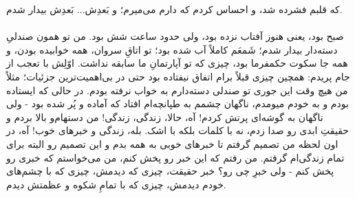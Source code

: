 \documentclass[12pt]{book}
\begin{document}
که قلبم فشرده شد، و احساس کردم که دارم می‌میرم؛ و بَعدِش... بَعدِش بیدار شدم.

    \paragraph{}
    صبح بود، یعنی هنوز آفتاب نزده بود، ولی حدود ساعت شش بود. من تو همون صندلیِ دسته‌دار بیدار شدم؛ شَمعَم کاملاً آب شده بود؛ تو اتاقِ سروان، همه خوابیده بودن، و همه جا سکوت حکمفرما بود، چیزی که تو آپارتمانِ ما سابقه نداشت. اوّلِش با تعجب از جام پریدم: همچین چیزی قبلاً برام اتفاق نیفتاده بود حتی در بی‌اهمیت‌ترین جزئیات؛ مثلاً من هیچ وقت این جوری تو صندلی دسته‌دارم به خواب نرفته بودم. در حالی که ایستاده بودم و به خودم میومدم، ناگهان چشمم به طپانچه‌ام افتاد که آماده و پُر شده بود - ولی ناگهان به گوشه‌ای پرتش کردم! آه، حالا، زندگی، زندگی! من دستهام‌و بالا بردم و حقیقتِ ابدی رو صدا زدم، نه با کلمات بلکه با اشک. بله، زندگی و خبرهای خوب! آه، در اون لحظه من تصمیم گرفتم تا خبرهای خوبی به همه بدم و این تصمیم رو البته برای تمام زندگی‌ام گرفتم. من رفتم که این خبر رو پخش کنم، من می‌خواستم که خبری رو پخش کنم - ولی خبرِ چی رو؟ خبر حقیقت، چیزی که دیدمش، چیزی که با چشم‌های خودم دیدمش، چیزی که با تمامِ شکوه و عظمتش دیدم.
\end{document}

